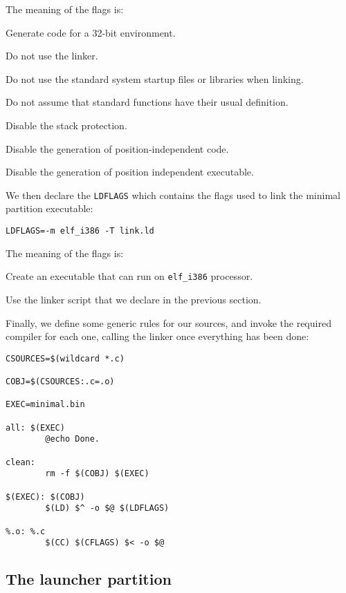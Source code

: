 \documentclass[10pt,a4paper,titlepage]{refart}
\begin{document}
The meaning of the flags is:

 
Generate code for a 32-bit environment.

Do not use the linker.

Do not use the standard system startup files or libraries when linking.

Do not assume that standard functions have their usual definition.

Disable the stack protection.

Disable the generation of position-independent code.

Disable the generation of position independent executable.

We then declare the \texttt{LDFLAGS} which contains the flags used to
link the minimal partition executable:

\begin{lstlisting}
LDFLAGS=-m elf_i386 -T link.ld
\end{lstlisting}

The meaning of the flags is:

Create an executable that can run on \texttt{elf\_i386} processor.

Use the linker script that we declare in the previous section.

Finally, we define some generic rules for our sources, and invoke the required
compiler for each one, calling the linker once everything has been done:

\begin{lstlisting}
CSOURCES=$(wildcard *.c)

COBJ=$(CSOURCES:.c=.o)

EXEC=minimal.bin

all: $(EXEC)
        @echo Done.

clean:
        rm -f $(COBJ) $(EXEC)

$(EXEC): $(COBJ)
        $(LD) $^ -o $@ $(LDFLAGS)

%.o: %.c
        $(CC) $(CFLAGS) $< -o $@
\end{lstlisting}

\subsection{The launcher partition}
\end{document}
